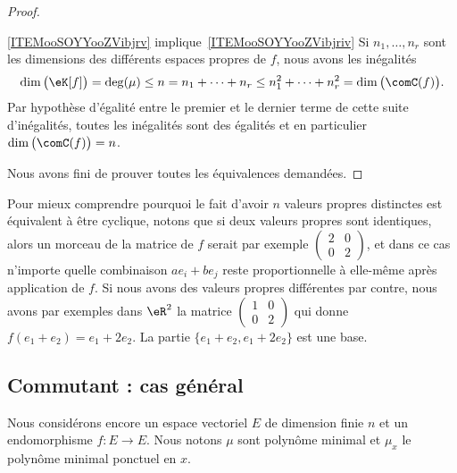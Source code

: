 \begin{proof}
\begin{subproof}
        \item[\ref{ITEMooSOYYooZVibjrv} implique~\ref{ITEMooSOYYooZVibjriv}]
            Si \( n_1,\ldots, n_r\) sont les dimensions des différents espaces propres de \( f\), nous avons les inégalités
            \begin{equation}
                \dim\big( \eK[f] \big)=\deg(\mu)\leq n=n_1+\cdots +n_r\leq n_1^2+\cdots +n_r^2=\dim\big( \comC(f) \big).
            \end{equation}
            Par hypothèse d'égalité entre le premier et le dernier terme de cette suite d'inégalités, toutes les inégalités sont des égalités et en particulier \( \dim\big( \comC(f) \big)=n\).
        \end{subproof}
            Nous avons fini de prouver toutes les équivalences demandées.
\end{proof}

\begin{example}
    Pour mieux comprendre pourquoi le fait d'avoir \( n\) valeurs propres distinctes est équivalent à être cyclique, notons que si deux valeurs propres sont identiques, alors un morceau de la matrice de \( f\) serait par exemple \( \begin{pmatrix}
          2  &   0    \\
        0    &   2
    \end{pmatrix}\), et dans ce cas n'importe quelle combinaison \( ae_i+be_j\) reste proportionnelle à elle-même après application de \( f\). Si nous avons des valeurs propres différentes par contre, nous avons par exemples dans \( \eR^2\) la matrice \( \begin{pmatrix}
        1    &   0    \\
        0    &   2
    \end{pmatrix}\) qui donne \( f(e_1+e_2)=e_1+2e_2\). La partie \( \{ e_1+e_2,e_1+2e_2 \}\) est une base.
\end{example}

\subsection{Commutant : cas général}

Nous considérons encore un espace vectoriel \( E\) de dimension finie \( n\) et un endomorphisme \( f\colon E\to E\). Nous notons \( \mu\) sont polynôme minimal et \( \mu_x\) le polynôme minimal ponctuel en \( x\).

